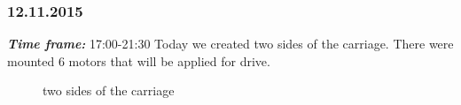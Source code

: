 \subsubsection{12.11.2015}
\textit{\textbf{Time frame:}} 17:00-21:30 \newline
Today we created two sides of the carriage. There were mounted 6 motors that will be applied for drive.

  	\begin{figure}[H]
  		\begin{minipage}[h]{1\linewidth}
  			\caption{two sides of the carriage}
  		\end{minipage}
  	\end{figure}
  	
